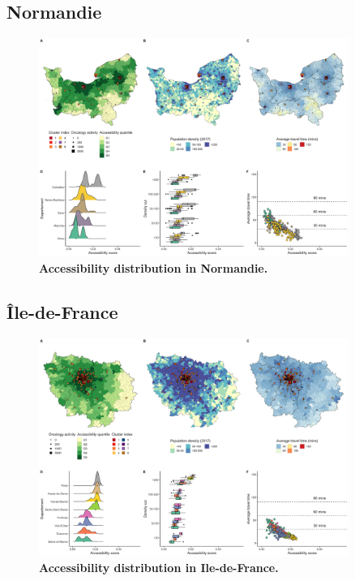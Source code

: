 \subsection*{Normandie}

\begin{figure}[H]
    \includegraphics[width=0.9\textwidth]{images/camion/region_accessibility/accessibility_Normandie.png}
    \centering
    \caption{
        \textbf{Accessibility distribution in Normandie.}
    }
\end{figure}

\subsection*{Île-de-France}

\begin{figure}[H]
    \includegraphics[width=0.9\textwidth]{images/camion/region_accessibility/accessibility_Ile-de-France.png}
    \centering
    \caption{
        \textbf{Accessibility distribution in Ile-de-France.}
    }
\end{figure}

